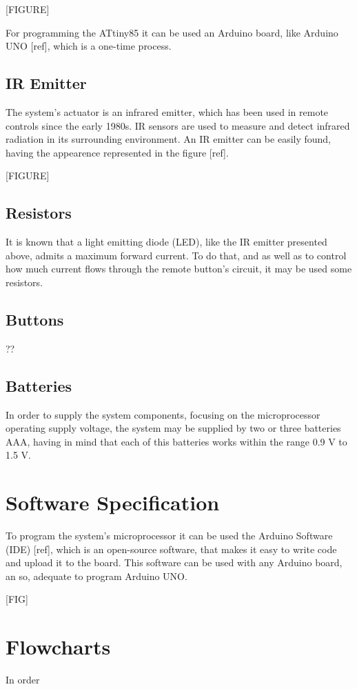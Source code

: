 \documentclass[12pt, letterpaper]{report}
\begin{document}
[FIGURE]


For programming the ATtiny85 it can be used an Arduino board, like Arduino UNO [ref], which is a one-time process.

\subsection{IR Emitter}
The system’s actuator is an infrared emitter, which has been used in remote controls since the early 1980s. IR sensors are used to measure and detect infrared radiation in its surrounding environment. An IR emitter can be easily found, having the appearence represented in the figure [ref].

[FIGURE]

\subsection{Resistors}
It is known that a light emitting diode (LED), like the IR emitter presented above, admits a maximum forward current. To do that, and as well as to control how much current flows through the remote button’s circuit, it may be used some resistors.

\subsection{Buttons}
??

\subsection{Batteries}
In order to supply the system components, focusing on the microprocessor operating supply voltage, the system may be supplied by two or three batteries AAA, having in mind that each of this batteries works within the range 0.9 V to 1.5 V.

\section{Software Specification}
To program the system’s microprocessor it can be used the Arduino Software (IDE) [ref], which is an open-source software, that makes it easy to write code and upload it to the board. This software can be used with any Arduino board, an so, adequate to program Arduino UNO.

[FIG]

\section{Flowcharts}
In order 
\end{document}
